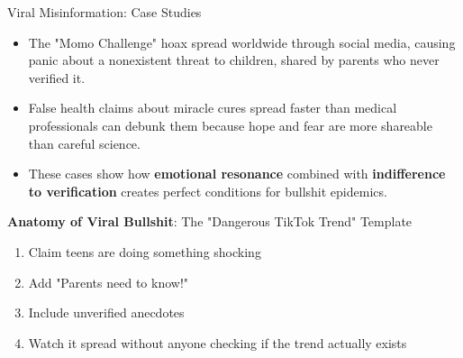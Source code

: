 \documentclass{beamer}
\begin{document}
	\begin{frame}{Viral Misinformation: Case Studies}
		\begin{itemize}
			\item The "Momo Challenge" hoax spread worldwide through social media, causing panic about a nonexistent threat to children, shared by parents who never verified it.
			\item False health claims about miracle cures spread faster than medical professionals can debunk them because hope and fear are more shareable than careful science.
			\item These cases show how \textbf{emotional resonance} combined with \textbf{indifference to verification} creates perfect conditions for bullshit epidemics.
		\end{itemize}
		
		\begin{example}
			\scriptsize
			\textbf{Anatomy of Viral Bullshit}: The "Dangerous TikTok Trend" Template
			\begin{enumerate}
				\item Claim teens are doing something shocking
				\item Add "Parents need to know!"
				\item Include unverified anecdotes
				\item Watch it spread without anyone checking if the trend actually exists
			\end{enumerate}
		\end{example}
	\end{frame}
	
\end{document}
